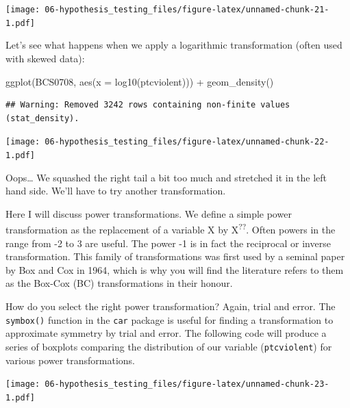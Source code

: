 \documentclass[
]{book}
\newenvironment{Shaded}{\begin{snugshade}}{\end{snugshade}}
\newcommand{\AttributeTok}[1]{\textcolor[rgb]{0.77,0.63,0.00}{#1}}
\newcommand{\FunctionTok}[1]{\textcolor[rgb]{0.00,0.00,0.00}{#1}}
\newcommand{\NormalTok}[1]{#1}
\newcommand{\SpecialCharTok}[1]{\textcolor[rgb]{0.00,0.00,0.00}{#1}}
\begin{document}
\texttt{[image: 06-hypothesis\_testing\_files/figure-latex/unnamed-chunk-21-1.pdf]}

Let's see what happens when we apply a logarithmic transformation (often used with skewed data):

\begin{Shaded}
\begin{Highlighting}[]
\FunctionTok{ggplot}\NormalTok{(BCS0708, }\FunctionTok{aes}\NormalTok{(}\AttributeTok{x =} \FunctionTok{log10}\NormalTok{(ptcviolent))) }\SpecialCharTok{+} 
  \FunctionTok{geom\_density}\NormalTok{()}
\end{Highlighting}
\end{Shaded}

\begin{verbatim}
## Warning: Removed 3242 rows containing non-finite values (stat_density).
\end{verbatim}

\texttt{[image: 06-hypothesis\_testing\_files/figure-latex/unnamed-chunk-22-1.pdf]}

Oops\ldots{} We squashed the right tail a bit too much and stretched it in the left hand side. We'll have to try another transformation.

Here I will discuss power transformations. We define a simple power transformation as the replacement of a variable X by X\textsuperscript{??}. Often powers in the range from -2 to 3 are useful. The power -1 is in fact the reciprocal or inverse transformation. This family of transformations was first used by a seminal paper by Box and Cox in 1964, which is why you will find the literature refers to them as the Box-Cox (BC) transformations in their honour.

How do you select the right power transformation? Again, trial and error. The \texttt{symbox()} function in the \texttt{car} package is useful for finding a transformation to approximate symmetry by trial and error. The following code will produce a series of boxplots comparing the distribution of our variable (\texttt{ptcviolent}) for various power transformations.

\begin{Shaded}
\end{Shaded}

\texttt{[image: 06-hypothesis\_testing\_files/figure-latex/unnamed-chunk-23-1.pdf]}
\end{document}
